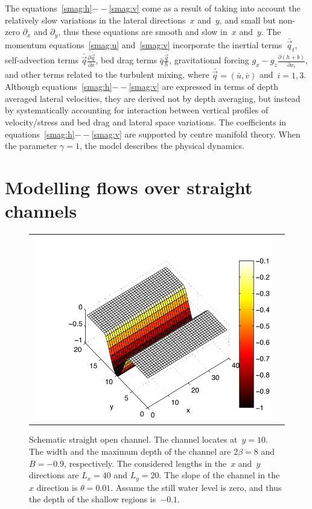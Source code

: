 \documentclass[12pt,a5paper]{article}
\newcommand{\uu}{{\bar u}}
\newcommand{\vv}{{\bar v}}
\newcommand{\bq}{{\bar q}}
\newcommand{\qq}{{\bar{\vec q}}}
\begin{document}
The equations~\eqref{smag:h}$--$\eqref{smag:v} come as a result of taking into account the relatively slow variations in the lateral directions~$x$ and~$y$, and small but non-zero $\partial_x$ and $\partial_y$, thus these equations are smooth and slow in~$x$ and~$y$.  
The momentum equations~\eqref{smag:u} and~\eqref{smag:v} incorporate the inertial terms~$\qq_t$, self-advection terms $\qq\frac{\partial\qq}{\partial x}$, bed drag terms $\bq\frac{\qq}{h}$, gravitational forcing $g_x-g_z\frac{\partial(h+b)}{\partial x_i}$, and other terms related to the turbulent mixing, where $\qq=(\uu,\vv)$ and~$i=1,3$. 
Although equations~\eqref{smag:h}$--$\eqref{smag:v} are expressed in terms of depth averaged lateral velocities, they are derived not by depth averaging, but instead by systematically accounting for interaction between vertical profiles of velocity/stress and bed drag and lateral space variations. 
The coefficients in equations~\eqref{smag:h}$--$\eqref{smag:v} are supported by centre manifold theory. 
When the parameter $\gamma=1$, the model describes the physical dynamics.


\section{Modelling flows over straight channels}
\label{sec-straight}

\begin{figure}
\centering
\begin{tabular}{c@{}c}
\includegraphics[width=\textwidth]{straight-channel}
\end{tabular}
\caption{Schematic straight open channel. 
The channel locates at~$y=10$. 
The width and the maximum depth of the channel are $2\beta=8$ and $B=-0.9$, respectively. 
The considered lengths in the~$x$ and~$y$ directions are $L_x=40$ and $L_y=20$. 
The slope of the channel in the~$x$ direction is $\theta=0.01$. 
Assume the still water level is zero, and thus the depth of the shallow regions is~$-0.1$.}
\label{straight-channel}
\end{figure}%
\end{document}

